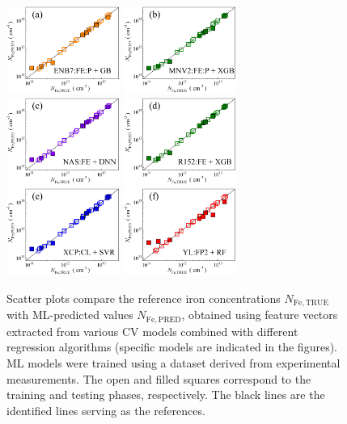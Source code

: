 \documentclass[10pt]{iopart}
\begin{document}
\begin{figure}
\includegraphics[width=0.33\textwidth]{Fig8a}
\includegraphics[width=0.33\textwidth]{Fig8b}
\includegraphics[width=0.33\textwidth]{Fig8c}
\includegraphics[width=0.33\textwidth]{Fig8d}
\includegraphics[width=0.33\textwidth]{Fig8e}
\includegraphics[width=0.33\textwidth]{Fig8f}
\caption{
Scatter plots compare the reference iron concentrations $N_\mathrm{Fe,TRUE}$ with ML-predicted values $N_\mathrm{Fe,PRED}$,
obtained using feature vectors extracted from various CV models combined with different regression algorithms
(specific models are indicated in the figures).
ML models were trained using a dataset derived from experimental measurements.
The open and filled squares correspond to the training and testing phases, respectively.
The black lines are the identified lines serving as the references.
}\label{Fig8}
\end{figure}
\end{document}
